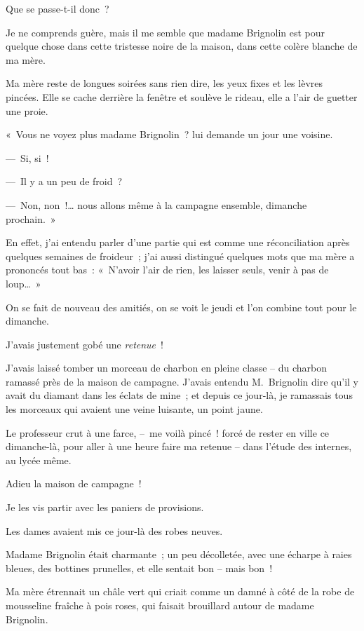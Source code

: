 \documentclass[french,twoside]{book} %
\begin{document}
\bigbreak
\noindent Que se passe-t-il donc ?\par
Je ne comprends guère, mais il me semble que madame Brignolin est pour quelque chose dans cette tristesse noire de la maison, dans cette colère blanche de ma mère.\par
Ma mère reste de longues soirées sans rien dire, les yeux fixes et les lèvres pincées. Elle se cache derrière la fenêtre et soulève le rideau, elle a l’air de guetter une proie.\par
\bigbreak
\noindent « Vous ne voyez plus madame Brignolin ? lui demande un jour une voisine.\par
— Si, si !\par
— Il y a un peu de froid ?\par
— Non, non !… nous allons même à la campagne ensemble, dimanche prochain. »\par
En effet, j’ai entendu parler d’une partie qui est comme une réconciliation après quelques semaines de froideur ; j’ai aussi distingué quelques mots que ma mère a prononcés tout bas : « N’avoir l’air de rien, les laisser seuls, venir à pas de loup… »\par
On se fait de nouveau des amitiés, on se voit le jeudi et l’on combine tout pour le dimanche.\par
\bigbreak
\noindent J’avais justement gobé une \emph{retenue} !\par
J’avais laissé tomber un morceau de charbon en pleine classe – du charbon ramassé près de la maison de campagne. J’avais entendu M. Brignolin dire qu’il y avait du diamant dans les éclats de mine ; et depuis ce jour-là, je ramassais tous les morceaux qui avaient une veine luisante, un point jaune.\par
Le professeur crut à une farce, – me voilà pincé ! forcé de rester en ville ce dimanche-là, pour aller à une heure faire ma retenue – dans l’étude des internes, au lycée même.\par
Adieu la maison de campagne !\par
Je les vis partir avec les paniers de provisions.\par
Les dames avaient mis ce jour-là des robes neuves.\par
Madame Brignolin était charmante ; un peu décolletée, avec une écharpe à raies bleues, des bottines prunelles, et elle sentait bon – mais bon !\par
Ma mère étrennait un châle vert qui criait comme un damné à côté de la robe de mousseline fraîche à pois roses, qui faisait brouillard autour de madame Brignolin.\par
\end{document}
